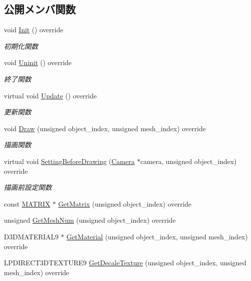\subsection*{公開メンバ関数}
\begin{DoxyCompactItemize}
\item 
void \mbox{\hyperlink{class_coin_draw_ad0f5da5cfb896541fd59b1ab4a8593d1}{Init}} () override
\begin{DoxyCompactList}\small\item\em 初期化関数 \end{DoxyCompactList}\item 
void \mbox{\hyperlink{class_coin_draw_a6484c22a5598e298f18e7cd6083cd551}{Uninit}} () override
\begin{DoxyCompactList}\small\item\em 終了関数 \end{DoxyCompactList}\item 
virtual void \mbox{\hyperlink{class_coin_draw_a6157b17bf1706b85156aad0d88acfd7e}{Update}} () override
\begin{DoxyCompactList}\small\item\em 更新関数 \end{DoxyCompactList}\item 
void \mbox{\hyperlink{class_coin_draw_ac7d91fecb6845cebe276eb81a4953563}{Draw}} (unsigned object\+\_\+index, unsigned mesh\+\_\+index) override
\begin{DoxyCompactList}\small\item\em 描画関数 \end{DoxyCompactList}\item 
virtual void \mbox{\hyperlink{class_coin_draw_a66c03acd675ac1820977cb21015abfdb}{Setting\+Before\+Drawing}} (\mbox{\hyperlink{class_camera}{Camera}} $\ast$camera, unsigned object\+\_\+index) override
\begin{DoxyCompactList}\small\item\em 描画前設定関数 \end{DoxyCompactList}\item 
const \mbox{\hyperlink{_vector3_d_8h_a032295cd9fb1b711757c90667278e744}{M\+A\+T\+R\+IX}} $\ast$ \mbox{\hyperlink{class_coin_draw_a8f5fd8668a4c66fe31446cc6f7c4afd7}{Get\+Matrix}} (unsigned object\+\_\+index) override
\item 
unsigned \mbox{\hyperlink{class_coin_draw_a178c8d88effe55aaad7d0e45b02e0566}{Get\+Mesh\+Num}} (unsigned object\+\_\+index) override
\item 
D3\+D\+M\+A\+T\+E\+R\+I\+A\+L9 $\ast$ \mbox{\hyperlink{class_coin_draw_a869a6b7273b273048dd56822fae4d644}{Get\+Material}} (unsigned object\+\_\+index, unsigned mesh\+\_\+index) override
\item 
L\+P\+D\+I\+R\+E\+C\+T3\+D\+T\+E\+X\+T\+U\+R\+E9 \mbox{\hyperlink{class_coin_draw_a1d4ab1a5c480833b8d8e7fe226136ad5}{Get\+Decale\+Texture}} (unsigned object\+\_\+index, unsigned mesh\+\_\+index) override
\end{DoxyCompactItemize}


